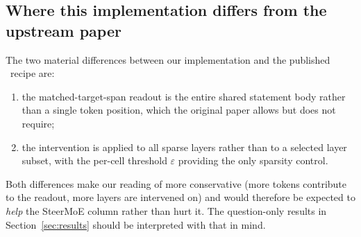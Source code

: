 \subsection{Where this implementation differs from the upstream paper}

The two material differences between our implementation and the published
\steermoe~recipe are:

\begin{enumerate}
  \item the matched-target-span readout is the entire shared statement body
  rather than a single token position, which the original paper allows but
  does not require;
  \item the intervention is applied to all sparse layers rather than to a
  selected layer subset, with the per-cell threshold $\varepsilon$ providing
  the only sparsity control.
\end{enumerate}

Both differences make our reading of \steermoe more conservative (more tokens
contribute to the readout, more layers are intervened on) and would therefore
be expected to \emph{help} the SteerMoE column rather than hurt it. The
question-only results in Section~\ref{sec:results} should be interpreted with
that in mind.
